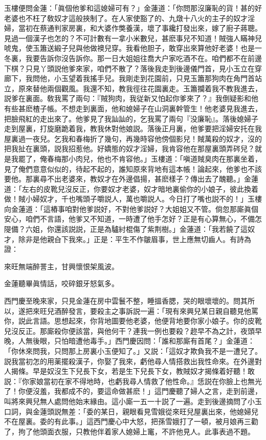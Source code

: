 玉樓便問金蓮：「眞個他爹和這媳婦可有？」金蓮道：「你問那沒廉恥的貨！甚的好老婆也不枉了敎奴才這般挾制了。在人家使豁了的、九燉十八火的主子的奴才淫婦，當初在蔡通判家房裏，和大婆作獘養漢，壞了事纔打發出來，嫁了廚子蔣聰。見過一個漢子也怎的？不可計數有一拿小米數兒，甚麽事兒不知道！賊強人瞞神兒唬鬼，使玉簫送緞子兒與他做襖兒穿。我看他胆子，敢穿出來算他好老婆！也是一冬裏，我要告訴你沒告訴你。那一日大姐姐往喬大户家吃酒不在。咱們都不在前邊下棋？只見丫頭説他爹來家，咱們不散了？落後我走到後邊儀門首，見小玉立在穿廊下，我問他，小玉望着我搖手兒。我剛走到花園前，只見玉簫那狗肉在角門首站立，原來替他兩個觀風。我還不知，教我徑往花園裏走。玉簫攔着我不教我進去，説爹在裏面。敎我罵了兩句：『賊狗肉，我従新又怕起你爹來了？』我倒疑影和他有些甚麽楂子帳。不想走到裏面，他和媳婦子在山洞裏幹管生！他老婆見我進去，把臉飛紅的走出來了。他爹見了我訕訕的，乞我罵了兩句『没廉恥』。落後媳婦子走到屋裏，打旋磨跪着我，教我休對他娘説。落後正月裏，他爹要把淫婦安托在我屋裏過一夜兒。乞我和春梅折了幾句，再幾時容他傍個影兒！賊萬殺的奴才，沒的把我扯在裏頭，説我招惹他。好嬌態的奴才淫婦，我肯容他在那屋裏頭弄硶兒？就是我罷了，俺春梅那小肉兒，他也不肯容他。」玉樓道：「嗔道賊臭肉在那裏坐着，見了俺們意意似似的，待起不起的，誰知原來背地有這本帳！論起來，他爹也不該要他。那裏尋不出老婆來，教奴才在外邊倡揚，甚麽樣子？傳出去了醜聽。」金蓮道：「左右的皮靴兒沒反正，你要奴才老婆，奴才暗地裏偷你的小娘子，彼此換着做！賊小婦奴才，千也嘴頭子嚼説人，萬也嚼説人。今日打了嘴也説不的！」玉樓向金蓮道：「這樁事咱對他爹説好，不對他爹説好？大姐姐又不管。倘忽那廝眞個安心，咱們不言語，他爹又不知道，一時遭了他手怎好？正是有心算無心，不備怎隄備？六姐，你還該説説，正是為驢紂棍傷了紫荆樹。」金蓮道：「我若饒了這奴才，除非是他親㒲下我來。」正是：平生不作皺眉事，世上應無切齒人。有詩為證：

來旺無端醉詈主，甘興懷恨架風波。

金蓮聽畢眞情話，咬碎銀牙怒氣多。

西門慶至晚來家，只見金蓮在房中雲鬟不整，睡搵香腮，哭的眼壞壞的。問其所以，遂把來旺兒酒醉發言，要殺主之事訴説一遍：「現有來興兒某日親自聽見他罵你，説此言語。思想起來，你背地圖要他老婆，他便背地要你家小娘子。你的皮靴兒沒反正。那廝殺你便該當，與他何干？連我一例也要殺？趂早不為之計，夜頭早晚，人無後眼，只怕暗遭他毒手。」西門慶因問：「誰和那廝有首尾？」金蓮道：「你休來問我，只問那上房裏小玉便知了。」又説：「這奴才欺負我不是一遭兒了。説我當初怎的用薬擺殺漢子，你娶了我來，虧他尋人情搭救出我性命來。在外邊對人揭條。早是奴沒生下兒長下女，若是生下兒長下女，教賊奴才揭條着好聽！敢説：『你家娘當初在家不得地時，也虧我尋人情救了他性命。』恁説在你臉上也無光了！你便沒羞，我都成不的，要這命做甚麽！」這門慶聽了婦人之言，走到前邊，叫將來興兒無人處問他始末緣由。這小廝一五一十説了一遍。走到後邊摘問了小玉口詞，與金蓮頭説無差：「委的某日，親眼看見雪娥從來旺兒屋裏出來，他媳婦兒不在屋裏。委的有此事。」這西門慶心中大怒，把孫雪娥打了一頓，被月娘再三勸了，拘了他頭面衣服，只教他伴着家人媳婦上竃，不許他見人。此事表過不題。

